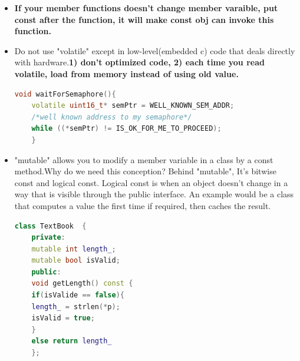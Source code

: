 \documentclass[a4paper,11pt,twoside]{book}
\newcommand{\Hilight}[1]{\makebox[0pt][l]{\color{yellow}\rule[-3pt]{#1em}{11pt}}}
\newcommand{\Hilight}[1]{}
\begin{document}
\begin{itemize}
\begin{enumerate}
		\item The most common use of \texttt{const} overloading is with the subscript operator. You should generally try to use one of the standard container templates, such as std::vector, but if you need to create your own class that has a subscript operator, here's the rule of thumb:\textbf{ subscript operators often come in pairs.}
		\begin{lstlisting}[frame=single, language=c++, mathescape=true]
		class Fred { /*...*/ };
		class MyFredList {
		public:
		$\Hilight{7}$const Fred& operator[] (unsigned index) const;
		// Subscript operators often come in pairs
		
		Fred&  operator[] (unsigned index);
		// Subscript operators often come in pairs
		};
		\end{lstlisting}
		
		
	\end{enumerate}
	
	\item \textbf{If your member functions doesn't change member varaible, put const after the function, it will make const obj can invoke this function.}
	
	\item Do not use "volatile" except in low-level(embedded c) code that deals directly with hardware.\textbf{1) don't optimized code, 2) each time you read volatile, load from memory instead of using old value.}
	\begin{lstlisting}[frame=single, language=c++]
	void waitForSemaphore(){
	volatile uint16_t* semPtr = WELL_KNOWN_SEM_ADDR;
	/*well known address to my semaphore*/
	while ((*semPtr) != IS_OK_FOR_ME_TO_PROCEED);
	}
	\end{lstlisting}
	
	\item "mutable" allows you to modify a member variable in a class by a const method.Why do we need this conception? Behind "mutable", It's bitwise const and logical const. Logical const is when an object doesn't change in a way that is visible through the public interface. An example would be a class that computes a value the first time if required, then caches the result.
	\begin{lstlisting}[frame=single, language=c++]
	class TextBook  {
	private:
	mutable int length_;
	mutable bool isValid;
	public:
	void getLength() const {
	if(isValide == false){
	length_ = strlen(*p);
	isValid = true; 
	}
	else return length_
	};
	\end{lstlisting}
	

\end{itemize}
\end{document}
